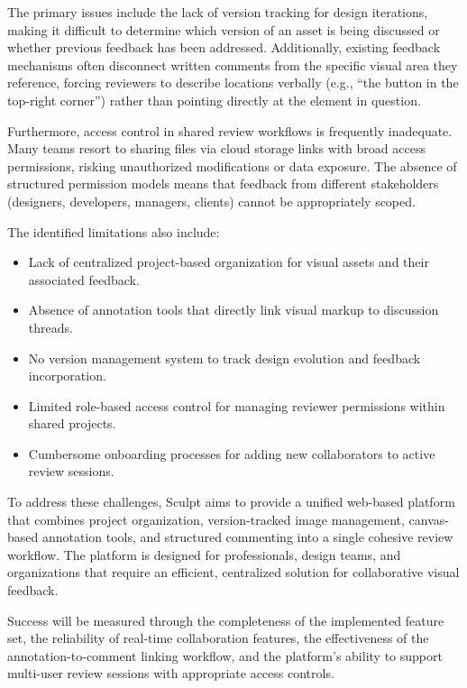 \documentclass[12pt,a4paper]{article}
\begin{document}
The primary issues include the lack of version tracking for design iterations, making it difficult to determine which version of an asset is being discussed or whether previous feedback has been addressed. Additionally, existing feedback mechanisms often disconnect written comments from the specific visual area they reference, forcing reviewers to describe locations verbally (e.g., ``the button in the top-right corner'') rather than pointing directly at the element in question.

Furthermore, access control in shared review workflows is frequently inadequate. Many teams resort to sharing files via cloud storage links with broad access permissions, risking unauthorized modifications or data exposure. The absence of structured permission models means that feedback from different stakeholders (designers, developers, managers, clients) cannot be appropriately scoped.

The identified limitations also include:
\begin{itemize}
    \item Lack of centralized project-based organization for visual assets and their associated feedback.
    \item Absence of annotation tools that directly link visual markup to discussion threads.
    \item No version management system to track design evolution and feedback incorporation.
    \item Limited role-based access control for managing reviewer permissions within shared projects.
    \item Cumbersome onboarding processes for adding new collaborators to active review sessions.
\end{itemize}

To address these challenges, Sculpt aims to provide a unified web-based platform that combines project organization, version-tracked image management, canvas-based annotation tools, and structured commenting into a single cohesive review workflow. The platform is designed for professionals, design teams, and organizations that require an efficient, centralized solution for collaborative visual feedback.

Success will be measured through the completeness of the implemented feature set, the reliability of real-time collaboration features, the effectiveness of the annotation-to-comment linking workflow, and the platform's ability to support multi-user review sessions with appropriate access controls.
\end{document}
